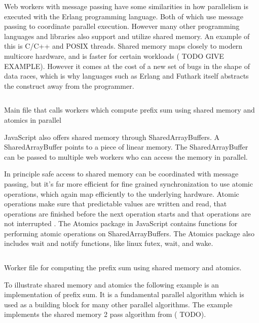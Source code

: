 \documentclass[11pt]{book}
\begin{document}
Web workers with message passing have some similarities in how parallelism is executed with the Erlang programming language. Both of which use message passing to coordinate parallel execution. However many other programming languages and libraries also support and utilize shared memory. An example of this is C/C++ and POSIX threads. Shared memory maps closely to modern multicore hardware, and is faster for certain workloads ({\color{red} TODO} GIVE EXAMPLE). However it comes at the cost of a new set of bugs in the shape of data races, which is why languages such as Erlang and Futhark itself abstracts the construct away from the programmer.
\begin{listing}[t!]    
        \inputminted[fontsize=\small,baselinestretch=0.5,linenos]{javascript}{code/shared/main.js}
        \caption{Main file that calls workers which compute prefix sum using shared memory and atomics in parallel}    
        \label{lst:main-js}    
\end{listing}    
JavaScript also offers shared memory through SharedArrayBuffers. A SharedArrayBuffer points to a piece of linear memory. The SharedArrayBuffer can be passed to multiple web workers who can access the memory in parallel. 

In principle safe access to shared memory can be coordinated with message passing, but it's far more efficient for fine grained synchronization to use atomic operations, which again map efficiently to the underlying hardware. Atomic operations make sure that predictable values are written and read, that operations are finished before the next operation starts and that operations are not interrupted \cite{js-atomics}. The Atomics package in JavaScript contains functions for performing atomic operations on SharedArrayBuffers. The Atomics package also includes wait and notify functions, like linux futex, wait, and wake.
\begin{listing}[b!]    
\inputminted[fontsize=\small,baselinestretch=0.5,linenos]{javascript}{code/shared/prefix_sum.js}
        \caption{Worker file for computing the prefix sum using shared memory and atomics.}    
        \label{lst:prefixsum-js}    
\end{listing}    

To illustrate shared memory and atomics the following example is an implementation of prefix sum. It is a fundamental parallel algorithm which is used as a building block for many other parallel algorithms. The example implements the shared memory 2 pass algorithm from ({\color{red} TODO}). 
\end{document}
